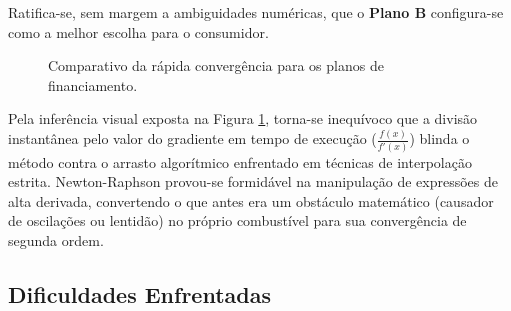 Ratifica-se, sem margem a ambiguidades numéricas, que o \textbf{Plano B} configura-se como a melhor escolha para o consumidor.

\begin{figure}[H]
    \centering
    \caption{Comparativo da rápida convergência para os planos de financiamento.}
    \label{fig:convergencia_newton_juros}
\end{figure}

Pela inferência visual exposta na Figura \ref{fig:convergencia_newton_juros}, torna-se inequívoco que a divisão instantânea pelo valor do gradiente em tempo de execução ($\frac{f(x)}{f'(x)}$) blinda o método contra o arrasto algorítmico enfrentado em técnicas de interpolação estrita. Newton-Raphson provou-se formidável na manipulação de expressões de alta derivada, convertendo o que antes era um obstáculo matemático (causador de oscilações ou lentidão) no próprio combustível para sua convergência de segunda ordem.

\subsection{Dificuldades Enfrentadas}
\label{subsec:dificuldades_newton_raphson}

